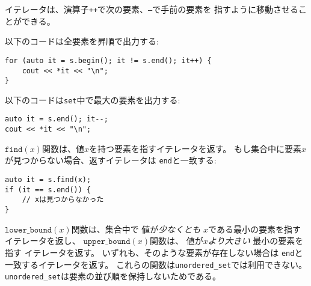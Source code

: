 イテレータは、演算子\texttt{++}で次の要素、\texttt{--}で手前の要素を
指すように移動させることができる。

以下のコードは全要素を昇順で出力する:
\begin{lstlisting}
for (auto it = s.begin(); it != s.end(); it++) {
    cout << *it << "\n";
}
\end{lstlisting}
\begin{comment}
The following code prints the largest element in the set:
\end{comment}
以下のコードは\texttt{set}中で最大の要素を出力する:
\begin{lstlisting}
auto it = s.end(); it--;
cout << *it << "\n";
\end{lstlisting}

\begin{comment}
The function $\texttt{find}(x)$ returns an iterator
that points to an element whose value is $x$.
However, if the set does not contain $x$,
the iterator will be \texttt{end}.

\begin{lstlisting}
auto it = s.find(x);
if (it == s.end()) {
    // x is not found
}
\end{lstlisting}
\end{comment}


$\texttt{find}(x)$関数は、値$x$を持つ要素を指すイテレータを返す。
もし集合中に要素$x$が見つからない場合、返すイテレータは
\texttt{end}と一致する:

\begin{lstlisting}
auto it = s.find(x);
if (it == s.end()) {
    // xは見つからなかった
}
\end{lstlisting}

\begin{comment}
The function $\texttt{lower\_bound}(x)$ returns
an iterator to the smallest element in the set
whose value is \emph{at least} $x$, and
the function $\texttt{upper\_bound}(x)$
returns an iterator to the smallest element in the set
whose value is \emph{larger than} $x$.
In both functions, if such an element does not exist,
the return value is \texttt{end}.
These functions are not supported by the
\texttt{unordered\_set} structure which
does not maintain the order of the elements.
\end{comment}

$\texttt{lower\_bound}(x)$関数は、集合中で
値が\emph{少なくとも} $x$である最小の要素を指す
イテレータを返し、
$\texttt{upper\_bound}(x)$関数は、
値が$x$\emph{より大きい} 最小の要素を指す
イテレータを返す。
いずれも、そのような要素が存在しない場合は
\texttt{end}と一致するイテレータを返す。
これらの関数は\texttt{unordered\_set}では利用できない。
\texttt{unordered\_set}は要素の並び順を保持しないためである。

